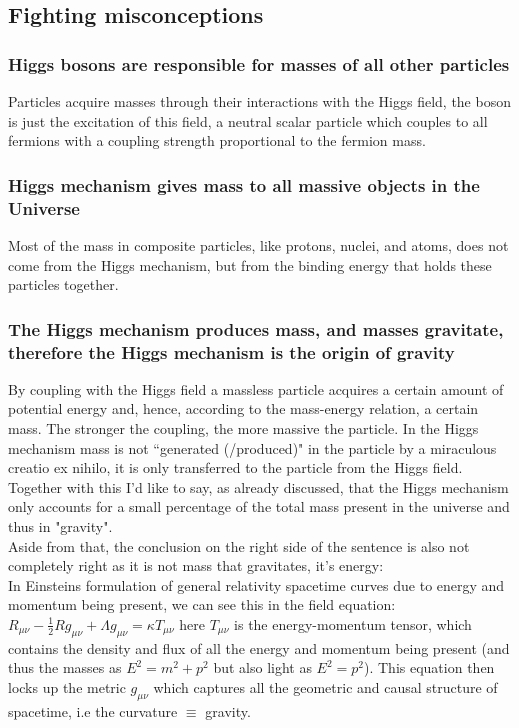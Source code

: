 \documentclass[10pt,a4paper,twoside]{article}
\begin{document}
\subsection{Fighting misconceptions}
\subsubsection{Higgs bosons are responsible for masses of all other particles}
Particles acquire masses through their interactions with the Higgs field, the boson is just the excitation of this field, a neutral scalar particle which couples to all fermions with a coupling strength proportional to the fermion mass.
\subsubsection{Higgs mechanism gives mass to all massive objects in the Universe}
Most of the mass in composite particles, like protons, nuclei, and atoms, does not come from the Higgs mechanism, but from the binding energy that holds these particles together.
\subsubsection{The Higgs mechanism produces mass, and masses gravitate, therefore the Higgs mechanism is the origin of gravity}
By coupling with the Higgs field a massless particle acquires a certain amount of potential energy and, hence, according to the mass-energy relation, a certain mass. The stronger the coupling, the more massive the particle. In the Higgs mechanism mass is not “generated (/produced)" in the particle by a miraculous creatio ex nihilo, it is only transferred to the particle from the Higgs field\cite{jammer2009concepts}. Together with this I'd like to say, as already discussed, that the Higgs mechanism only accounts for a small percentage of the total mass present in the universe and thus in "gravity".\\
Aside from that, the conclusion on the right side of the sentence is also not completely right as it is not mass that gravitates, it's energy:\\
In Einsteins formulation of general relativity spacetime curves due to energy and momentum being present, we can see this in the field equation:
$R_{\mu \nu}-\frac{1}{2} R g_{\mu \nu}+\Lambda g_{\mu \nu}=\kappa T_{\mu \nu}$
here $T_{\mu \nu}$ is the energy-momentum tensor, which contains the density and flux of all the energy and momentum being present (and thus the masses as $E^2 = m^2 + p^2$ but also light as $E^2 = p^2$). This equation then locks up the metric $g_{\mu\nu}$ which captures all the geometric and causal structure of spacetime, i.e the curvature $\equiv$ gravity.
\end{document}
